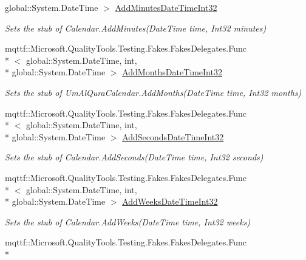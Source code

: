 \begin{DoxyCompactItemize}
global\-::\-System.\-Date\-Time $>$ \hyperlink{class_system_1_1_globalization_1_1_fakes_1_1_stub_um_al_qura_calendar_aed584e389ba72da2be250e8ba3858139}{Add\-Minutes\-Date\-Time\-Int32}
\begin{DoxyCompactList}\small\item\em Sets the stub of Calendar.\-Add\-Minutes(\-Date\-Time time, Int32 minutes)\end{DoxyCompactList}\item 
mqttf\-::\-Microsoft.\-Quality\-Tools.\-Testing.\-Fakes.\-Fakes\-Delegates.\-Func\\*
$<$ global\-::\-System.\-Date\-Time, int, \\*
global\-::\-System.\-Date\-Time $>$ \hyperlink{class_system_1_1_globalization_1_1_fakes_1_1_stub_um_al_qura_calendar_a77b49ea9d382976958a514dbcce9fc7a}{Add\-Months\-Date\-Time\-Int32}
\begin{DoxyCompactList}\small\item\em Sets the stub of Um\-Al\-Qura\-Calendar.\-Add\-Months(\-Date\-Time time, Int32 months)\end{DoxyCompactList}\item 
mqttf\-::\-Microsoft.\-Quality\-Tools.\-Testing.\-Fakes.\-Fakes\-Delegates.\-Func\\*
$<$ global\-::\-System.\-Date\-Time, int, \\*
global\-::\-System.\-Date\-Time $>$ \hyperlink{class_system_1_1_globalization_1_1_fakes_1_1_stub_um_al_qura_calendar_acbd707880be17a3e210f7b54fe1867a8}{Add\-Seconds\-Date\-Time\-Int32}
\begin{DoxyCompactList}\small\item\em Sets the stub of Calendar.\-Add\-Seconds(\-Date\-Time time, Int32 seconds)\end{DoxyCompactList}\item 
mqttf\-::\-Microsoft.\-Quality\-Tools.\-Testing.\-Fakes.\-Fakes\-Delegates.\-Func\\*
$<$ global\-::\-System.\-Date\-Time, int, \\*
global\-::\-System.\-Date\-Time $>$ \hyperlink{class_system_1_1_globalization_1_1_fakes_1_1_stub_um_al_qura_calendar_a70f530bdf1ad8c9babd176c33907b055}{Add\-Weeks\-Date\-Time\-Int32}
\begin{DoxyCompactList}\small\item\em Sets the stub of Calendar.\-Add\-Weeks(\-Date\-Time time, Int32 weeks)\end{DoxyCompactList}\item 
mqttf\-::\-Microsoft.\-Quality\-Tools.\-Testing.\-Fakes.\-Fakes\-Delegates.\-Func\\*

\end{DoxyCompactItemize}
